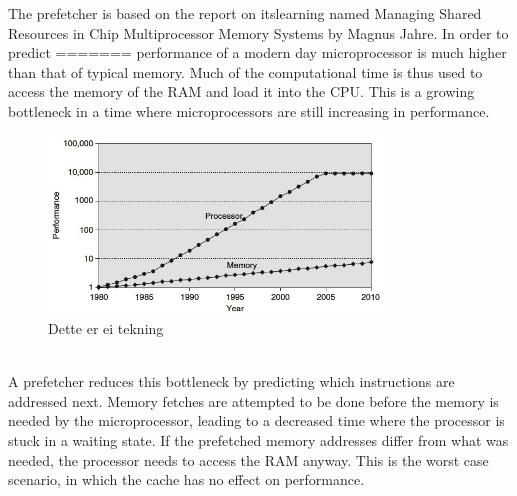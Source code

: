 The prefetcher is based on the report on itslearning named Managing Shared Resources in Chip Multiprocessor Memory Systems by Magnus Jahre. In order to predict
=======
 performance of a modern day microprocessor is much higher than that of typical memory. Much of the computational time is thus used to access the memory of the RAM and load it into the CPU. This is a growing bottleneck in a time where microprocessors are still increasing in performance. 
\\
\begin{figure}[h!]
	\includegraphics[width=3.5in]{graphics/CPUmemoryGap.jpg}
	\caption{Dette er ei tekning}
\end{figure}
\\
A prefetcher reduces this bottleneck by predicting which instructions are addressed next. Memory fetches are attempted to be done before the memory is needed by the microprocessor, leading to a decreased time where the processor is stuck in a waiting state. If the prefetched memory addresses differ from what was needed, the processor needs to access the RAM anyway. This is the worst case scenario, in which the cache has no effect on performance.
